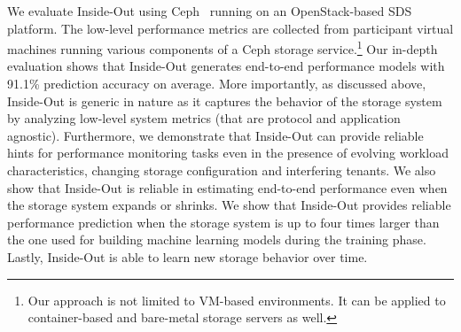We evaluate Inside-Out using Ceph~\cite{ceph} %
running on an OpenStack-based SDS platform.
The low-level performance metrics are collected from participant virtual machines 
running various components of a Ceph storage service.\footnote{\label{ft:vm}
Our approach is not limited to VM-based environments.
It can be applied to container-based and bare-metal storage servers as well.
}
Our in-depth evaluation shows that Inside-Out generates end-to-end performance models with 91.1\% prediction accuracy on average.
More importantly, as discussed above, Inside-Out is generic in nature as it captures the behavior of the storage system 
by analyzing low-level system metrics (that are protocol and application agnostic). Furthermore, we demonstrate that Inside-Out 
can provide reliable hints for performance monitoring tasks even in the presence of evolving workload characteristics, changing storage 
configuration and interfering tenants. We also show that Inside-Out is reliable in estimating end-to-end performance 
even when the storage system expands or shrinks.
We show that Inside-Out provides reliable performance 
prediction when the storage system is up to four times larger than the one used for building machine learning models during 
the training phase. 
Lastly, Inside-Out is able to learn new storage behavior over time.